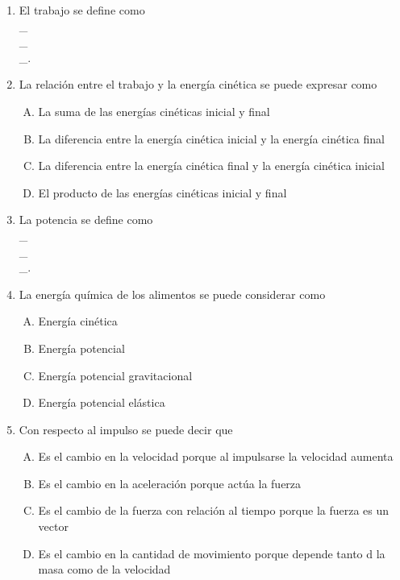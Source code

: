 \begin{enumerate}
\item El trabajo se define como \label{yolf-13}\hrulefill\\
\_\hrulefill\\
\_\hrulefill\\
\_\hrulefill.


\item La relación entre el trabajo y la energía cinética se puede expresar como \label{yolf-14}\\

\begin{enumerate}[(A)]
\item  La suma de las energías cinéticas inicial y final
\item  La diferencia entre la energía cinética inicial y la energía cinética final
\item  La diferencia entre la energía cinética final y la energía cinética inicial
\item  El producto de las energías cinéticas inicial y final
\end{enumerate}

\item La potencia se define como \label{yolf-15}\hrulefill\\
\_\hrulefill\\
\_\hrulefill\\
\_\hrulefill.

\item La energía química de los alimentos se puede considerar como \label{yolf-16}\\

\begin{enumerate}[(A)]
\item  Energía cinética
\item  Energía potencial
\item  Energía potencial gravitacional
\item  Energía potencial elástica
\end{enumerate}

\item Con respecto al impulso se puede decir que \label{yolf-17}\\
\begin{enumerate}[(A)]
\item  Es el cambio en la velocidad porque al impulsarse la velocidad aumenta
\item  Es el cambio en la aceleración porque actúa la fuerza
\item  Es el cambio de la fuerza con relación al tiempo porque la fuerza es un vector
\item  Es el cambio en la cantidad de movimiento porque depende tanto d la masa como de la velocidad
\end{enumerate}


\end{enumerate}
